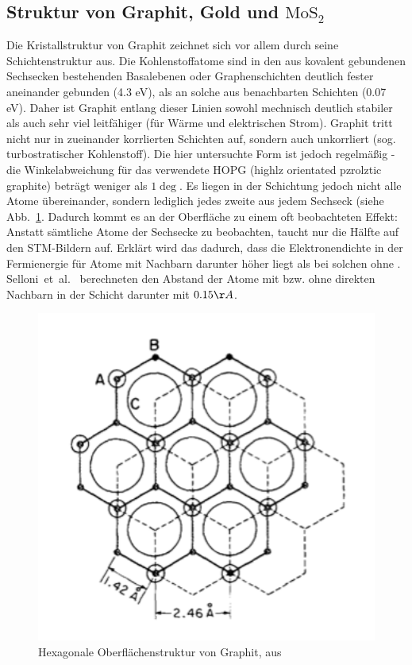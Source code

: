 \subsection{Struktur von Graphit, Gold und $\mathrm{MoS_2}$}
Die Kristallstruktur von Graphit zeichnet sich vor allem durch seine Schichtenstruktur 
aus. Die Kohlenstoffatome sind in den aus kovalent gebundenen Sechsecken bestehenden 
Basalebenen oder Graphenschichten deutlich fester aneinander gebunden (4.3 eV), als 
an solche aus benachbarten Schichten (0.07 eV). Daher ist Graphit entlang dieser Linien 
sowohl mechnisch deutlich stabiler als auch sehr viel leitfähiger (für Wärme und 
elektrischen Strom). Graphit tritt nicht nur in zueinander korrlierten Schichten auf, 
sondern auch unkorrliert (sog. turbostratischer Kohlenstoff). Die hier untersuchte Form 
ist jedoch regelmäßig - die Winkelabweichung für das verwendete HOPG (highlz orientated 
pzrolztic graphite) beträgt weniger als $1 \deg$. Es liegen in der Schichtung jedoch 
nicht alle Atome übereinander, sondern lediglich jedes zweite aus jedem Sechseck (siehe 
Abb.~\ref{fig:graphite}. Dadurch kommt es an der Oberfläche zu einem oft beobachteten 
Effekt: Anstatt sämtliche Atome der Sechsecke zu beobachten, taucht nur die Hälfte auf 
den STM-Bildern auf. Erklärt wird das dadurch, dass die Elektronendichte in der 
Fermienergie für Atome mit Nachbarn darunter höher liegt als bei solchen ohne
\cite{zeinalipour2008new}. Selloni~et~al.~\cite{Sellino1985} berechneten den Abstand 
der Atome mit bzw. ohne direkten Nachbarn in der Schicht darunter mit $0.15 \AA$. 


\begin{figure}
    \includegraphics[width=1.0\textwidth]{pics_theo/graphite}
    \caption{Hexagonale Oberflächenstruktur von Graphit, aus \cite{park1986tunneling}}
    \label{fig:graphite}
\end{figure} 


